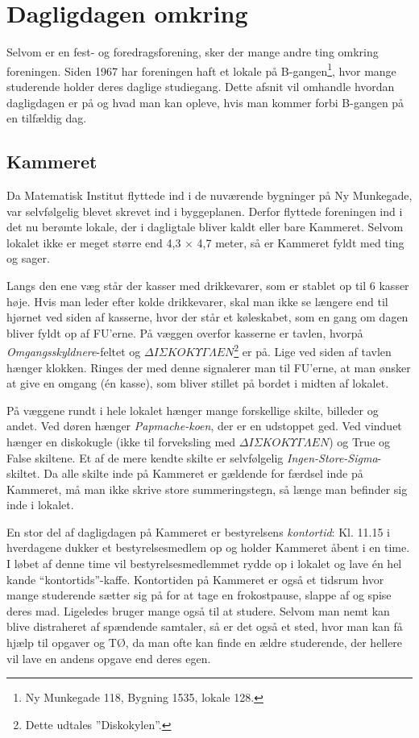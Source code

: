 \chapter{Dagligdagen omkring \TKET}
Selvom \TKET er en fest- og foredragsforening, sker der mange andre ting omkring foreningen. Siden 1967 har foreningen haft et lokale på B-gangen\footnote{Ny Munkegade 118, Bygning 1535, lokale 128.}, hvor mange studerende holder deres daglige studiegang. Dette afsnit vil omhandle hvordan dagligdagen er på \TKET og hvad man kan opleve, hvis man kommer forbi B-gangen på en tilfældig dag.

\section{Kammeret}
Da Matematisk Institut flyttede ind i de nuværende bygninger på Ny Munkegade, var \TKET selvfølgelig blevet skrevet ind i byggeplanen. Derfor flyttede foreningen ind i det nu berømte lokale, der i dagligtale bliver kaldt \TKET eller bare Kammeret. Selvom lokalet ikke er meget større end 4,3 $\times$ 4,7 meter, så er Kammeret fyldt med ting og sager. 

Langs den ene væg står der kasser med drikkevarer, som er stablet op til 6 kasser høje. Hvis man leder efter kolde drikkevarer, skal man ikke se længere end til hjørnet ved siden af kasserne, hvor der står et køleskabet, som en gang om dagen bliver fyldt op af FU'erne. På væggen overfor kasserne er tavlen, hvorpå \textit{Omgangsskyldnere}-feltet og $\Delta I\Sigma KOK\Upsilon\Gamma\Lambda EN$\footnote{Dette udtales ''Diskokylen''.}
er på. Lige ved siden af tavlen hænger klokken. Ringes der med denne signalerer man til FU'erne, at man ønsker at give en omgang (én kasse), som bliver stillet på bordet i midten af lokalet. 

På væggene rundt i hele lokalet hænger mange forskellige skilte, billeder og andet. Ved døren hænger \textit{Papmache-koen}, der er en udstoppet ged. Ved vinduet hænger en diskokugle (ikke til forveksling med $\Delta I\Sigma KOK\Upsilon\Gamma\Lambda EN$) og True og False skiltene. Et af de mere kendte skilte er selvfølgelig \textit{Ingen-Store-Sigma}-skiltet. Da alle skilte inde på Kammeret er gældende for færdsel inde på Kammeret, må man ikke skrive store summeringstegn, så længe man befinder sig inde i lokalet.

En stor del af dagligdagen på Kammeret er bestyrelsens \textit{kontortid}: Kl. 11.15 i hverdagene dukker et bestyrelsesmedlem op og holder Kammeret åbent i en time. I løbet af denne time vil bestyrelsesmedlemmet rydde op i lokalet og lave én hel kande ``kontortids''-kaffe. Kontortiden på Kammeret er også et tidsrum hvor mange studerende sætter sig på \TKET for at tage en frokostpause, slappe af og spise deres mad. Ligeledes bruger mange også \TKET til at studere. Selvom man nemt kan blive distraheret af spændende samtaler, så er det også et sted, hvor man kan få hjælp til opgaver og TØ, da man ofte kan finde en ældre studerende, der hellere vil lave en andens opgave end deres egen.

